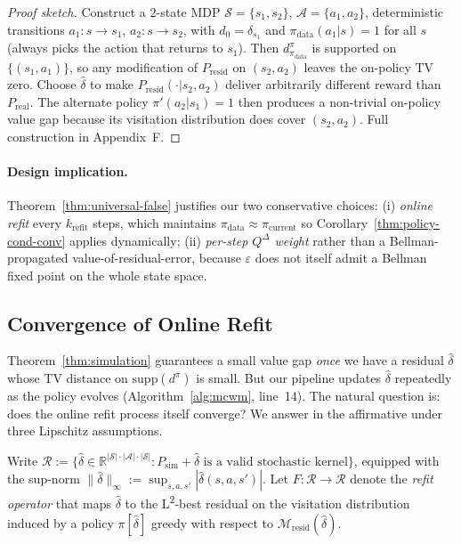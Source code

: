\documentclass{article}
\theoremstyle{definition}
\newcommand{\Mresid}{\mathcal{M}_{\mathrm{resid}}}
\newcommand{\Psim}{P_{\mathrm{sim}}}
\newcommand{\Preal}{P_{\mathrm{real}}}
\newcommand{\Presid}{P_{\mathrm{resid}}}
\newcommand{\eps}{\varepsilon}
\newcommand{\supp}{\mathrm{supp}}
\newcommand{\dpi}{d^{\pi}}
\newcommand{\pidata}{\pi_{\mathrm{data}}}
\newcommand{\QD}{Q^{\Delta}}
\begin{document}
\begin{proof}[Proof sketch]  Construct a $2$-state MDP
$\mathcal S=\{s_1,s_2\}$, $\mathcal A=\{a_1,a_2\}$, deterministic
transitions $a_1\!:s\to s_1$, $a_2\!:s\to s_2$, with $d_0=\delta_{s_1}$
and $\pidata(a_1|s)=1$ for all $s$ (always picks the action that returns
to $s_1$).  Then $\dpi_{\pidata}$ is supported on $\{(s_1,a_1)\}$, so
any modification of $\Presid$ on $(s_2,a_2)$ leaves the on-policy TV
zero.  Choose $\hat\delta$ to make $\Presid(\cdot|s_2,a_2)$ deliver
arbitrarily different reward than $\Preal$.  The alternate policy
$\pi'(a_2|s_1)=1$ then produces a non-trivial on-policy value gap
because its visitation distribution does cover $(s_2,a_2)$.  Full
construction in Appendix~F.
\end{proof}

\paragraph{Design implication.}  Theorem~\ref{thm:universal-false}
justifies our two conservative choices: (i) \emph{online refit} every
$k_{\mathrm{refit}}$ steps, which maintains $\pidata\approx\pi_{\mathrm{current}}$
so Corollary~\ref{thm:policy-cond-conv} applies dynamically; (ii)
\emph{per-step $\QD$ weight} rather than a Bellman-propagated
value-of-residual-error, because $\eps$ does not itself admit a Bellman
fixed point on the whole state space.

\subsection{Convergence of Online Refit}
\label{sec:refit}

Theorem~\ref{thm:simulation} guarantees a small value gap \emph{once}
we have a residual $\hat\delta$ whose TV distance on $\supp(\dpi)$ is
small.  But our pipeline updates $\hat\delta$ repeatedly as the policy
evolves (Algorithm~\ref{alg:mcwm}, line~14).  The natural question is:
does the online refit process itself converge?  We answer in the
affirmative under three Lipschitz assumptions.

Write $\mathcal{R} := \{\hat\delta \in \mathbb R^{|\mathcal S|\cdot |\mathcal A|\cdot |\mathcal S|}
 : \Psim + \hat\delta \text{ is a valid stochastic kernel}\}$,
equipped with the sup-norm
$\|\hat\delta\|_\infty := \sup_{s,a,s'} |\hat\delta(s,a,s')|$.
Let $F : \mathcal{R} \to \mathcal{R}$ denote the \emph{refit operator}
that maps $\hat\delta$ to the L\textsuperscript{2}-best residual on the
visitation distribution induced by a policy $\pi[\hat\delta]$ greedy
with respect to $\Mresid(\hat\delta)$.
\end{document}
